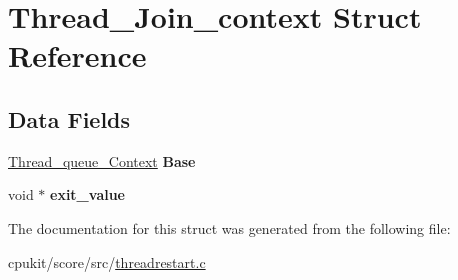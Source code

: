 \hypertarget{structThread__Join__context}{}\section{Thread\+\_\+\+Join\+\_\+context Struct Reference}
\label{structThread__Join__context}
\subsection*{Data Fields}
\begin{DoxyCompactItemize}
\item 
\mbox{\label{structThread__Join__context_aaff7aa62ba86c0d873fc5e8e7357475a}} 
\mbox{\hyperlink{structThread__queue__Context}{Thread\+\_\+queue\+\_\+\+Context}} {\bfseries Base}
\item 
\mbox{\label{structThread__Join__context_af87674b2b059130e2d461a9ad8c33636}} 
void $\ast$ {\bfseries exit\+\_\+value}
\end{DoxyCompactItemize}


The documentation for this struct was generated from the following file\+:\begin{DoxyCompactItemize}
\item 
cpukit/score/src/\mbox{\hyperlink{threadrestart_8c}{threadrestart.\+c}}\end{DoxyCompactItemize}
